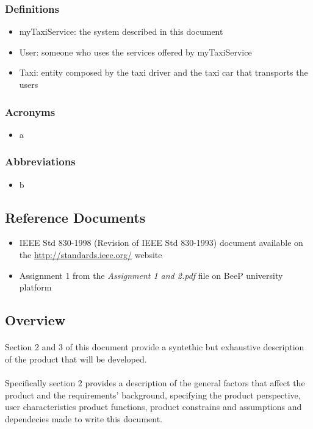 		\subsubsection{Definitions}
		\begin{itemize}
			\item myTaxiService: the system described in this document
			\item User: someone who uses the services offered by myTaxiService
			\item Taxi: entity composed by the taxi driver and the taxi car that transports the users
		\end{itemize}
		\subsubsection{Acronyms}
		\begin{itemize}
			\item a
		\end{itemize}
		\subsubsection{Abbreviations}
		\begin{itemize}
			\item b
		\end{itemize}
	\subsection{Reference Documents}
	\begin{itemize}
		\item IEEE Std 830-1998 (Revision of IEEE Std 830-1993) document available on the \url{http://standards.ieee.org/} website
		\item Assignment 1 from the \emph{Assignment 1 and 2.pdf} file on BeeP university platform
	\end{itemize}
	\subsection{Overview}
		\paragraph*{}Section 2 and 3 of this document provide a syntethic but exhaustive description of the product that will be developed.		
		\paragraph*{}Specifically section 2 provides a description of the general factors that affect the product and the requirements' background, specifying the product perspective, user characteristics product functions, product constrains and assumptions and dependecies made to write this document.
